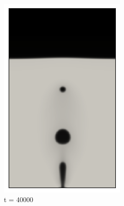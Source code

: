 \begin{figure}[H]
	\medskip
	\begin{subfigure}{0.25\textwidth}
		\includegraphics[width=\linewidth]{figs/cap4/bb_760_s40}
		\caption{t = 40000}
		\label{fig:7}
	\end{subfigure}\hfil
	\begin{subfigure}{0.25\textwidth}

\end{subfigure}
\end{figure}
